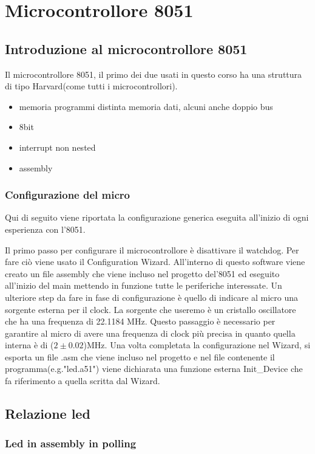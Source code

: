\documentclass[main.tex]{subfiles}
\begin{document}
\chapter{Microcontrollore 8051}

\section{Introduzione al microcontrollore 8051}
Il microcontrollore 8051, il primo dei due usati in questo corso ha una struttura di tipo Harvard(come tutti i microcontrollori). 
\begin{itemize}
    \item memoria programmi distinta memoria dati, alcuni anche doppio bus
    \item 8bit
    \item interrupt non nested
    \item assembly
    
\end{itemize}

\subsection{Configurazione del micro}
Qui di seguito viene riportata la configurazione generica eseguita all'inizio di ogni esperienza con l'8051.

Il primo passo per configurare il microcontrollore è disattivare il watchdog. Per fare ciò viene usato il Configuration Wizard. All'interno di questo software viene creato un file assembly che viene incluso nel progetto del'8051 ed eseguito all'inizio del main mettendo in funzione tutte le periferiche interessate. Un ulteriore step da fare in fase di configurazione è quello di indicare al micro una sorgente esterna per il clock. La sorgente che useremo è un cristallo oscillatore che ha una frequenza di 22.1184 MHz. Questo passaggio è necessario per garantire al micro di avere una frequenza di clock più precisa in quanto quella interna è di ($2\pm0.02$)MHz.
Una volta completata la configurazione nel Wizard, si esporta un file .asm che viene incluso nel progetto e nel file contenente il programma(e.g."led.a51") viene dichiarata una funzione esterna Init\_Device che fa riferimento a quella scritta dal Wizard.

\section{Relazione led}
\subsection{Led in assembly in polling}
\end{document}

